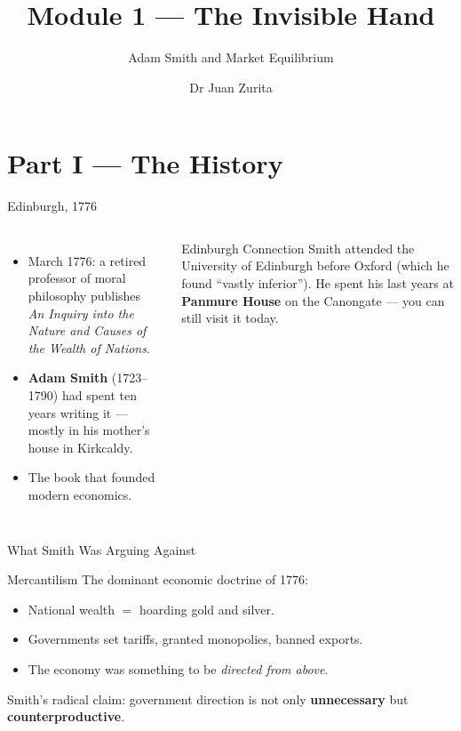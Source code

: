 \documentclass[aspectratio=169, 10pt]{beamer}
\title{Module 1 --- The Invisible Hand}
\subtitle{Adam Smith and Market Equilibrium}
\author{Dr Juan Zurita}
\institute{From Smith to Simulation\\
The University of Edinburgh~$\cdot$~School of Economics}
\date{}
\begin{document}
\maketitle

\section{Part I --- The History}

\begin{frame}{Edinburgh, 1776}
\begin{columns}[T]
\begin{itemize}
  \item March 1776: a retired professor of moral philosophy publishes\\
        \textit{An Inquiry into the Nature and Causes of the Wealth of Nations}.
  \item \textbf{Adam Smith} (1723--1790) had spent ten years writing it ---
        mostly in his mother's house in Kirkcaldy.
  \item The book that \alert{founded modern economics}.
\end{itemize}
\begin{block}{Edinburgh Connection}
Smith attended the University of Edinburgh before Oxford (which he found
``vastly inferior''). He spent his last years at \textbf{Panmure House}
on the Canongate --- you can still visit it today.
\end{block}
\end{columns}
\end{frame}

\begin{frame}{What Smith Was Arguing Against}
\begin{block}{Mercantilism}
  The dominant economic doctrine of 1776:
  \begin{itemize}
    \item National wealth $=$ hoarding gold and silver.
    \item Governments set tariffs, granted monopolies, banned exports.
    \item The economy was something to be \textit{directed from above}.
  \end{itemize}
\end{block}
\vspace{0.5em}
Smith's radical claim: government direction is not only \textbf{unnecessary} but
\textbf{counterproductive}.
\end{frame}
\end{document}
